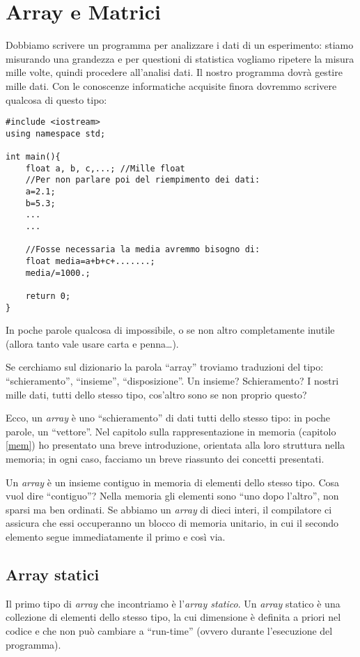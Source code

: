 \chapter{Array e Matrici}\label{array}
Dobbiamo scrivere un programma per analizzare i dati di un esperimento: stiamo misurando una grandezza e per questioni di statistica vogliamo ripetere la misura mille volte, quindi procedere all'analisi dati. Il nostro programma dovrà gestire mille dati. Con le conoscenze informatiche acquisite finora dovremmo scrivere qualcosa di questo tipo:

\begin{lstlisting}[label=esdati]
#include <iostream>
using namespace std;

int main(){
	float a, b, c,...; //Mille float
	//Per non parlare poi del riempimento dei dati:
	a=2.1;
	b=5.3;
	...
	...
	
	//Fosse necessaria la media avremmo bisogno di:
	float media=a+b+c+.......;
	media/=1000.;

	return 0;
}
\end{lstlisting}

In poche parole qualcosa di impossibile, o se non altro completamente inutile (allora tanto vale usare carta e penna\ldots).

Se cerchiamo sul dizionario la parola ``array'' troviamo traduzioni del tipo: ``schieramento'', ``insieme'', ``disposizione''. Un insieme? Schieramento? I nostri mille dati, tutti dello stesso tipo, cos'altro sono se non proprio questo?
	

Ecco, un \emph{array} è uno ``schieramento'' di dati tutti dello stesso tipo: in poche parole, un ``vettore''. Nel capitolo sulla rappresentazione in memoria (capitolo \ref{mem}) ho presentato una breve introduzione, orientata alla loro struttura nella memoria; in ogni caso, facciamo un breve riassunto dei concetti presentati. 

Un \emph{array} è un insieme contiguo in memoria di elementi dello stesso tipo. Cosa vuol dire ``contiguo''? Nella memoria gli elementi sono ``uno dopo l'altro'', non sparsi ma ben ordinati. Se abbiamo un \emph{array} di dieci interi, il compilatore ci assicura che essi occuperanno un blocco di memoria unitario, in cui il secondo elemento segue immediatamente il primo e così via.

\section{Array statici}
Il primo tipo di \emph{array} che incontriamo è l'\emph{array statico}. Un \emph{array} statico è una collezione di elementi dello stesso tipo, la cui dimensione è definita a priori nel codice e che non può cambiare a ``run-time'' (ovvero durante l'esecuzione del programma).

